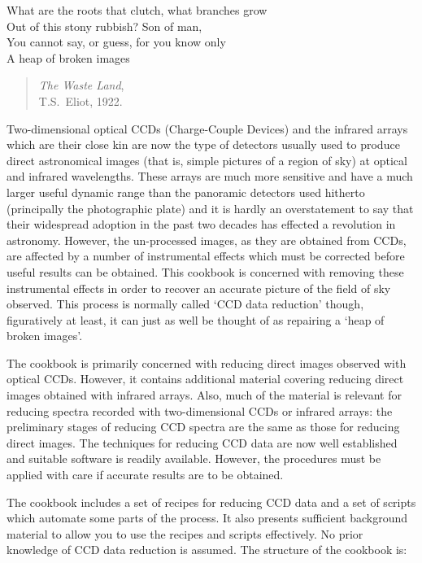\documentclass[twoside,11pt]{article}
\begin{document}
\begin{center}
\begin{minipage}[t]{3.4in}
What are the roots that clutch, what branches grow \\
Out of this stony rubbish?  Son of man, \\
You cannot say, or guess, for you know only \\
A heap of broken images
\end{minipage}
\end{center}

\begin{quote}
{\it The Waste Land},  \raggedleft \\
T.S.~Eliot, 1922.      \raggedleft
\end{quote}

Two-dimensional optical CCDs (Charge-Couple Devices) and the infrared
arrays which are their close kin are now the type of detectors usually
used to produce direct astronomical images (that is, simple pictures
of a region of sky) at optical and infrared wavelengths.  These arrays
are much more sensitive and have a much larger useful dynamic range
than the panoramic detectors used hitherto (principally the photographic
plate) and it is hardly an overstatement to say that their widespread
adoption in the past two decades has effected a revolution in astronomy.
However, the un-processed images, as they are obtained from CCDs, are
affected by a number of instrumental effects which must be corrected before
useful results can be obtained.  This cookbook is concerned with removing
these instrumental effects in order to recover an accurate picture of the
field of sky observed.  This process is normally called `CCD data reduction'
though, figuratively at least, it can just as well be thought of as
repairing a `heap of broken images'.

The cookbook is primarily concerned with reducing direct images observed
with optical CCDs.  However, it contains additional material covering
reducing direct images obtained with infrared arrays.  Also, much of the
material is relevant for reducing spectra recorded with two-dimensional
CCDs or infrared arrays: the preliminary stages of reducing CCD spectra
are the same as those for reducing direct images.  The techniques for
reducing CCD data are now well established and suitable software is
readily available.  However, the procedures must be applied with care if
accurate results are to be obtained.

The cookbook includes a set of recipes for reducing CCD data and a set
of scripts which automate some parts of the process.  It also presents
sufficient background material to allow you to use the recipes and scripts
effectively.  No prior knowledge of CCD data reduction is assumed.  The
structure of the cookbook is:
\end{document}
